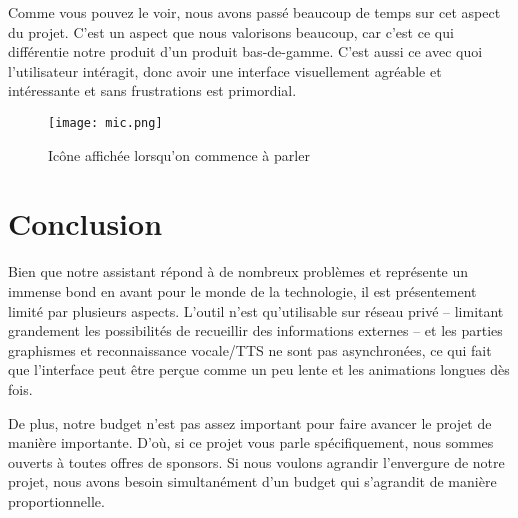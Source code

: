 \documentclass[11pt]{scrartcl} %
\begin{document}
Comme vous pouvez le voir, nous avons passé beaucoup de temps sur cet aspect du projet.
C'est un aspect que nous valorisons beaucoup, car c'est ce qui différentie notre produit d'un produit bas-de-gamme.
C'est aussi ce avec quoi l'utilisateur intéragit, donc avoir une interface visuellement agréable et intéressante et sans frustrations est primordial.

\begin{figure}[ht]
	\centering
	\texttt{[image: mic.png]}
	\caption{Icône affichée lorsqu'on commence à parler}
\end{figure}

\section{Conclusion}

Bien que notre assistant répond à de nombreux problèmes et représente un immense bond en avant pour le monde de la technologie, il est présentement limité par plusieurs aspects.
L'outil n'est qu'utilisable sur réseau privé -- limitant grandement les possibilités de recueillir des informations externes -- et les parties graphismes et reconnaissance vocale/TTS ne sont pas asynchronées, ce qui fait que l'interface peut être perçue comme un peu lente et les animations longues dès fois.

De plus, notre budget n'est pas assez important pour faire avancer le projet de manière importante. D'où, si ce projet vous parle spécifiquement, nous sommes ouverts à toutes offres de sponsors.
Si nous voulons agrandir l'envergure de notre projet, nous avons besoin simultanément d'un budget qui s'agrandit de manière proportionnelle.
\end{document}
